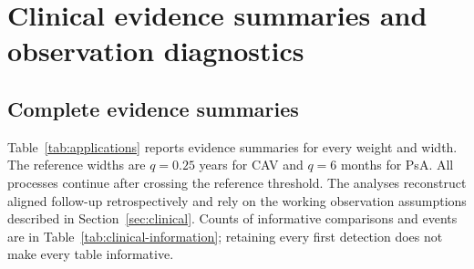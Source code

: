 \documentclass[12pt]{article}
\theoremstyle{definition}
\theoremstyle{remark}
\begin{document}
\section{Clinical evidence summaries and observation diagnostics}
\label{sec:clinical-supplement}

\subsection{Complete evidence summaries}

Table~\ref{tab:applications} reports evidence summaries for every weight and width. The reference widths are $q=0.25$ years for CAV and $q=6$ months for PsA. All processes continue after crossing the reference threshold. The analyses reconstruct aligned follow-up retrospectively and rely on the working observation assumptions described in Section~\ref{sec:clinical}. Counts of informative comparisons and events are in Table~\ref{tab:clinical-information}; retaining every first detection does not make every table informative.
\end{document}
